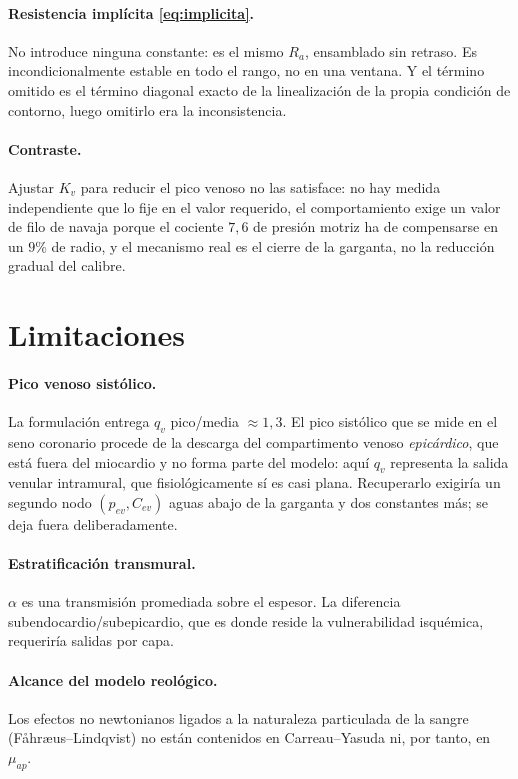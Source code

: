 \documentclass[11pt]{article}
\begin{document}
\paragraph{Resistencia impl\'icita \eqref{eq:implicita}.} No introduce ninguna
constante: es el mismo $R_a$, ensamblado sin retraso. Es incondicionalmente
estable en todo el rango, no en una ventana. Y el t\'ermino omitido es el
t\'ermino diagonal exacto de la linealizaci\'on de la propia condici\'on de
contorno, luego omitirlo era la inconsistencia.

\paragraph{Contraste.} Ajustar $K_v$ para reducir el pico venoso no las
satisface: no hay medida independiente que lo fije en el valor requerido, el
comportamiento exige un valor de filo de navaja porque el cociente $7{,}6$ de
presi\'on motriz ha de compensarse en un $9\%$ de radio, y el mecanismo real es
el cierre de la garganta, no la reducci\'on gradual del calibre.

\section{Limitaciones}

\paragraph{Pico venoso sist\'olico.} La formulaci\'on entrega $q_v$ pico/media
$\approx1{,}3$. El pico sist\'olico que se mide en el seno coronario procede de
la descarga del compartimento venoso \emph{epic\'ardico}, que est\'a fuera del
miocardio y no forma parte del modelo: aqu\'i $q_v$ representa la salida
venular intramural, que fisiol\'ogicamente s\'i es casi plana. Recuperarlo
exigir\'ia un segundo nodo $(p_{ev},C_{ev})$ aguas abajo de la garganta y dos
constantes m\'as; se deja fuera deliberadamente.

\paragraph{Estratificaci\'on transmural.} $\alpha$ es una transmisi\'on
promediada sobre el espesor. La diferencia subendocardio/subepicardio, que es
donde reside la vulnerabilidad isqu\'emica, requerir\'ia salidas por capa.

\paragraph{Alcance del modelo reol\'ogico.} Los efectos no newtonianos ligados
a la naturaleza particulada de la sangre (F\aa hr\ae us--Lindqvist) no est\'an
contenidos en Carreau--Yasuda ni, por tanto, en $\mu_{ap}$.
\end{document}
